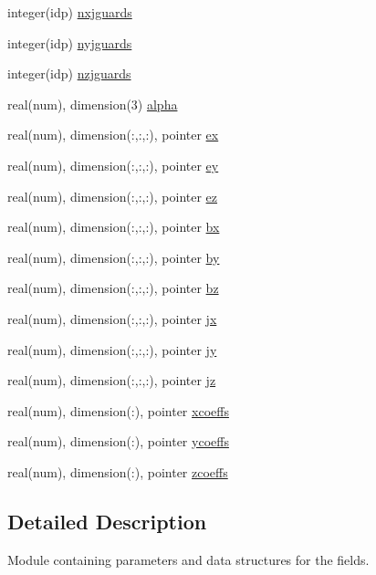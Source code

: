 \begin{DoxyCompactItemize}
\item 
integer(idp) \hyperlink{namespacefields_a775a9360ab07f232c9c55bf737fa25e4}{nxjguards}
\item 
integer(idp) \hyperlink{namespacefields_a040a1f8e7a331db1b9d025819a7e9453}{nyjguards}
\item 
integer(idp) \hyperlink{namespacefields_ae8d3cd10ec1c6301ada4c9cad60c1125}{nzjguards}
\item 
real(num), dimension(3) \hyperlink{namespacefields_a123e475dfb74b9d51f0cefd3aa32f4ef}{alpha}
\item 
real(num), dimension(\+:,\+:,\+:), pointer \hyperlink{namespacefields_a4b459092bf44b6c1e18d38c5b67ffdd8}{ex}
\item 
real(num), dimension(\+:,\+:,\+:), pointer \hyperlink{namespacefields_a416c4dba2dc5fb0ac7cbeb6bdbaffc2c}{ey}
\item 
real(num), dimension(\+:,\+:,\+:), pointer \hyperlink{namespacefields_a0fa6f30ad153ef0e52f181d70e3b92e1}{ez}
\item 
real(num), dimension(\+:,\+:,\+:), pointer \hyperlink{namespacefields_ae5c4690c74e129bc786b6880e43e5263}{bx}
\item 
real(num), dimension(\+:,\+:,\+:), pointer \hyperlink{namespacefields_a945637961cd81816fb389b3aff1bcdc6}{by}
\item 
real(num), dimension(\+:,\+:,\+:), pointer \hyperlink{namespacefields_aaf0c4459b6c5caf1375fef4b33801e86}{bz}
\item 
real(num), dimension(\+:,\+:,\+:), pointer \hyperlink{namespacefields_ab4aadb2986a77b2c2546cee63c380fca}{jx}
\item 
real(num), dimension(\+:,\+:,\+:), pointer \hyperlink{namespacefields_aacf6032b8f949c35388351665b007c93}{jy}
\item 
real(num), dimension(\+:,\+:,\+:), pointer \hyperlink{namespacefields_ad1f49be91f74095a76edaa8ff8c26c8c}{jz}
\item 
real(num), dimension(\+:), pointer \hyperlink{namespacefields_af385d7c4d2f11c483c899d7f4aa8b3ca}{xcoeffs}
\item 
real(num), dimension(\+:), pointer \hyperlink{namespacefields_a13ae96bfb25ee0698529585220416d5e}{ycoeffs}
\item 
real(num), dimension(\+:), pointer \hyperlink{namespacefields_aab4aa30b16b003222aa946420ff709d6}{zcoeffs}
\end{DoxyCompactItemize}


\subsection{Detailed Description}
Module containing parameters and data structures for the fields. 

